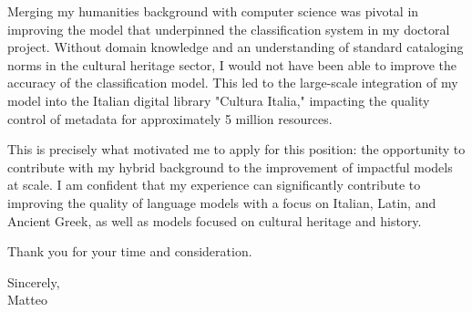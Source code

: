 \documentclass[letter,11pt]{article}
\begin{document}
\begin{flushleft}
Merging my humanities background with computer science was pivotal in improving the model that underpinned the classification system in my doctoral project. Without domain knowledge and an understanding of standard cataloging norms in the cultural heritage sector, I would not have been able to improve the accuracy of the classification model. This led to the large-scale integration of my model into the Italian digital library "Cultura Italia," impacting the quality control of metadata for approximately 5 million resources.

This is precisely what motivated me to apply for this position: the opportunity to contribute with my hybrid background to the improvement of impactful models at scale. I am confident that my experience can significantly contribute to improving the quality of language models with a focus on Italian, Latin, and Ancient Greek, as well as models focused on cultural heritage and history.

Thank you for your time and consideration.

Sincerely,\\[2em]

Matteo

\end{flushleft}
\end{document}

